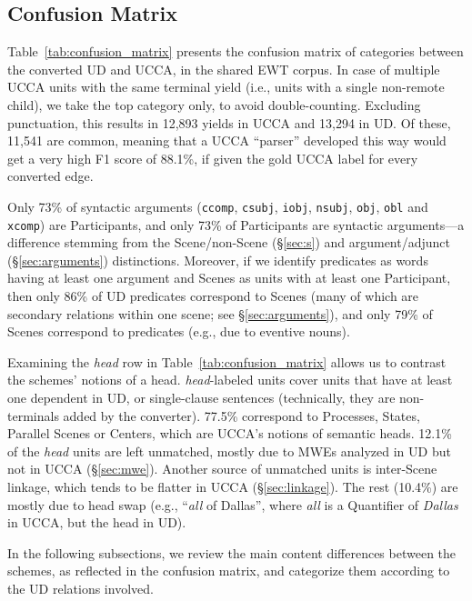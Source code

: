 \documentclass[11pt,a4paper]{article}
\begin{document}
\subsection{Confusion Matrix}\label{sec:confusion}

Table~\ref{tab:confusion_matrix} presents the confusion matrix of categories between
the converted UD and UCCA, in the shared EWT corpus.
In case of multiple UCCA units with the same terminal yield (i.e., units with a single non-remote child),
we take the top category only, to avoid double-counting.
Excluding punctuation, this results in 12,893 yields in UCCA and
13,294 in UD.
Of these, 11,541 are common, meaning that a UCCA ``parser'' developed this way
would get a very high F1 score
of 88.1\%, if given the gold UCCA label for every converted edge.

Only 73\% of syntactic arguments
(\texttt{ccomp}, \texttt{csubj}, \texttt{iobj}, \texttt{nsubj}, \texttt{obj}, \texttt{obl} and \texttt{xcomp})
are Participants,
and only 73\% of Participants are syntactic arguments---a difference stemming from
the Scene/non-Scene (\S\ref{sec:s}) and argument/adjunct (\S\ref{sec:arguments}) distinctions.
Moreover, if we identify predicates as words having at least one argument
and Scenes as units with at least one Participant,
then only 86\% of UD predicates correspond to Scenes (many of which are secondary relations within one scene; see \S\ref{sec:arguments}),
and only 79\% of Scenes correspond to predicates (e.g., due to eventive nouns).

Examining the {\it head} row in Table~\ref{tab:confusion_matrix} allows
us to contrast the schemes' notions of a head. 
{\it head}-labeled units cover units that have at least
one dependent in UD, or single-clause sentences (technically, they are non-terminals added by the converter).
77.5\% correspond to Processes, States, Parallel Scenes or Centers,
which are UCCA's notions of semantic heads.
12.1\% of the {\it head} units are left unmatched, mostly due to MWEs analyzed in
UD but not in UCCA (\S\ref{sec:mwe}).
Another source of unmatched units is inter-Scene linkage, which tends to be flatter in
UCCA (\S\ref{sec:linkage}).
The rest (10.4\%) are mostly due to head swap (e.g., ``\textit{all} of Dallas'', where \textit{all}
is a Quantifier of \textit{Dallas} in UCCA, but the head in UD).

In the following subsections, we review the main content differences between the schemes,
as reflected in the confusion matrix, and categorize them according to the UD relations
involved.
\end{document}
